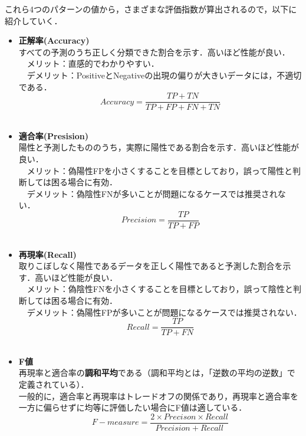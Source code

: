 \documentclass[a4j, 11pt]{jsarticle}
\numberwithin{equation}{section}
\begin{document}
\indent これら4つのパターンの値から，さまざまな評価指数が算出されるので，以下に紹介していく．
\begin {itemize}

\item \textbf{正解率(Accuracy)}\\
\indent すべての予測のうち正しく分類できた割合を示す．高いほど性能が良い．\\
\indent　メリット：直感的でわかりやすい．\\
\indent　デメリット：PositiveとNegativeの出現の偏りが大きいデータには，不適切である．\\
\begin{equation*}
	Accuracy = \frac{TP+TN}{TP+FP+FN+TN}
\end{equation*}
\\
\item \textbf{適合率(Presision)}\\
\indent  陽性と予測したもののうち，実際に陽性である割合を示す．高いほど性能が良い．\\
\indent　メリット：偽陽性FPを小さくすることを目標としており，誤って陽性と判断しては困る場合に有効．\\
\indent　デメリット：偽陰性FNが多いことが問題になるケースでは推奨されない．\\
\begin{equation*}
	Precision = \frac{TP}{TP+FP}
\end{equation*}
\\
\item \textbf{再現率(Recall)}\\
\indent  取りこぼしなく陽性であるデータを正しく陽性であると予測した割合を示す．高いほど性能が良い．\\
\indent　メリット：偽陰性FNを小さくすることを目標としており，誤って陰性と判断しては困る場合に有効．\\
\indent　デメリット：偽陽性FPが多いことが問題になるケースでは推奨されない．\\
\begin{equation*}
	Recall = \frac{TP}{TP+FN}
\end{equation*}
\\
\item \textbf{F値}\\
\indent 再現率と適合率の\textbf{調和平均}である（調和平均とは，「逆数の平均の逆数」で定義されている）．\\
\indent 一般的に，適合率と再現率はトレードオフの関係であり，再現率と適合率を一方に偏らせずに均等に評価したい場合にF値は適している．\\
\begin{equation*}
	F-measure = \frac{2\times Precison\times Recall}{Precision+Recall}
\end{equation*}
\end{itemize}
\end{document}

